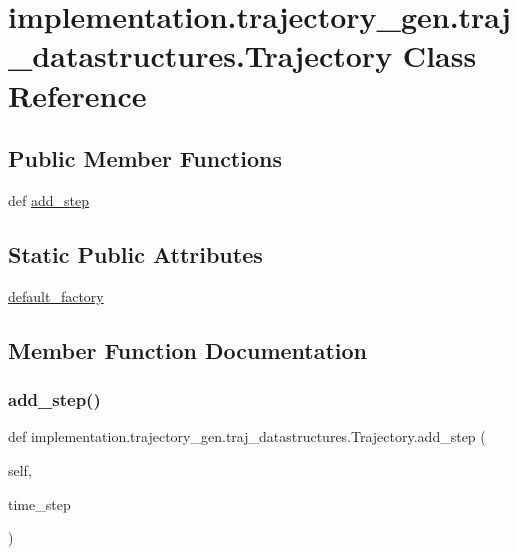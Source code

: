 \hypertarget{classimplementation_1_1trajectory__gen_1_1traj__datastructures_1_1_trajectory}{}\section{implementation.\+trajectory\+\_\+gen.\+traj\+\_\+datastructures.\+Trajectory Class Reference}
\label{classimplementation_1_1trajectory__gen_1_1traj__datastructures_1_1_trajectory}
\subsection*{Public Member Functions}
\begin{DoxyCompactItemize}
\item 
def \hyperlink{classimplementation_1_1trajectory__gen_1_1traj__datastructures_1_1_trajectory_aac0332d50e3c8d1efdf35b937a5a0655}{add\+\_\+step}
\end{DoxyCompactItemize}
\subsection*{Static Public Attributes}
\begin{DoxyCompactItemize}
\item 
\hyperlink{classimplementation_1_1trajectory__gen_1_1traj__datastructures_1_1_trajectory_ae71f42de736c82f5c9ba379e75aa3f64}{default\+\_\+factory}
\end{DoxyCompactItemize}


\subsection{Member Function Documentation}
\mbox{\label{classimplementation_1_1trajectory__gen_1_1traj__datastructures_1_1_trajectory_aac0332d50e3c8d1efdf35b937a5a0655}} 
\subsubsection{\texorpdfstring{add\+\_\+step()}{add\_step()}}
{\footnotesize\ttfamily def implementation.\+trajectory\+\_\+gen.\+traj\+\_\+datastructures.\+Trajectory.\+add\+\_\+step (\begin{DoxyParamCaption}\item[{}]{self,  }\item[{}]{time\+\_\+step }\end{DoxyParamCaption})}



